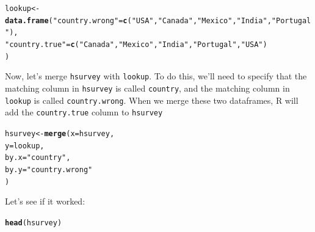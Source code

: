 \documentclass{tufte-book}\usepackage[]{graphicx}\usepackage[]{color}
\makeatletter
\newcommand{\hlstr}[1]{\textcolor[rgb]{0.192,0.494,0.8}{#1}}%
\newcommand{\hlstd}[1]{\textcolor[rgb]{0.345,0.345,0.345}{#1}}%
\newcommand{\hlkwb}[1]{\textcolor[rgb]{0.69,0.353,0.396}{#1}}%
\newcommand{\hlkwc}[1]{\textcolor[rgb]{0.333,0.667,0.333}{#1}}%
\newcommand{\hlkwd}[1]{\textcolor[rgb]{0.737,0.353,0.396}{\textbf{#1}}}%
\newenvironment{kframe}{%
 \def\at@end@of@kframe{}%
 \ifinner\ifhmode%
  \def\at@end@of@kframe{\end{minipage}}%
  \begin{minipage}{\columnwidth}%
 \fi\fi%
 \def\FrameCommand##1{\hskip\@totalleftmargin \hskip-\fboxsep
 \colorbox{shadecolor}{##1}\hskip-\fboxsep
     \hskip-\linewidth \hskip-\@totalleftmargin \hskip\columnwidth}%
 \MakeFramed {\advance\hsize-\width
   \@totalleftmargin\z@ \linewidth\hsize
   \@setminipage}}%
 {\par\unskip\endMakeFramed%
 \at@end@of@kframe}
\newenvironment{knitrout}{}{} %
\makeatother
\begin{document}
\begin{footnotesize}
\begin{footnotesize}
\begin{knitrout}
\color{fgcolor}\begin{kframe}
\begin{alltt}
\hlstd{lookup} \hlkwb{<-} \hlkwd{data.frame}\hlstd{(}\hlstr{"country.wrong"} \hlstd{=} \hlkwd{c}\hlstd{(}\hlstr{"USA"}\hlstd{,} \hlstr{"Canada"}\hlstd{,} \hlstr{"Mexico"}\hlstd{,} \hlstr{"India"}\hlstd{,} \hlstr{"Portugal"}\hlstd{),}
                     \hlstr{"country.true"} \hlstd{=} \hlkwd{c}\hlstd{(}\hlstr{"Canada"}\hlstd{,} \hlstr{"Mexico"}\hlstd{,} \hlstr{"India"}\hlstd{,} \hlstr{"Portugal"}\hlstd{,} \hlstr{"USA"}\hlstd{)}
                     \hlstd{)}
\end{alltt}
\end{kframe}
\end{knitrout}
\end{footnotesize}

Now, let's merge \texttt{hsurvey} with \texttt{lookup}. To do this, we'll need to specify that the matching column in \texttt{hsurvey} is called \texttt{country}, and the matching column in \texttt{lookup} is called \texttt{country.wrong}. When we merge these two dataframes, R will add the \texttt{country.true} column to \texttt{hsurvey}


\begin{knitrout}
\color{fgcolor}\begin{kframe}
\begin{alltt}
\hlstd{hsurvey} \hlkwb{<-} \hlkwd{merge}\hlstd{(}\hlkwc{x} \hlstd{= hsurvey,}
      \hlkwc{y} \hlstd{= lookup,}
      \hlkwc{by.x} \hlstd{=} \hlstr{"country"}\hlstd{,}
      \hlkwc{by.y} \hlstd{=} \hlstr{"country.wrong"}
      \hlstd{)}
\end{alltt}


{\ttfamily\noindent\bfseries{}}\end{kframe}
\end{knitrout}


Let's see if it worked:
\begin{footnotesize}
\begin{knitrout}
\color{fgcolor}\begin{kframe}
\begin{alltt}
\hlkwd{head}\hlstd{(hsurvey)}
\end{alltt}



\end{kframe}
\end{knitrout}
\end{footnotesize}
\end{footnotesize}
\end{document}
